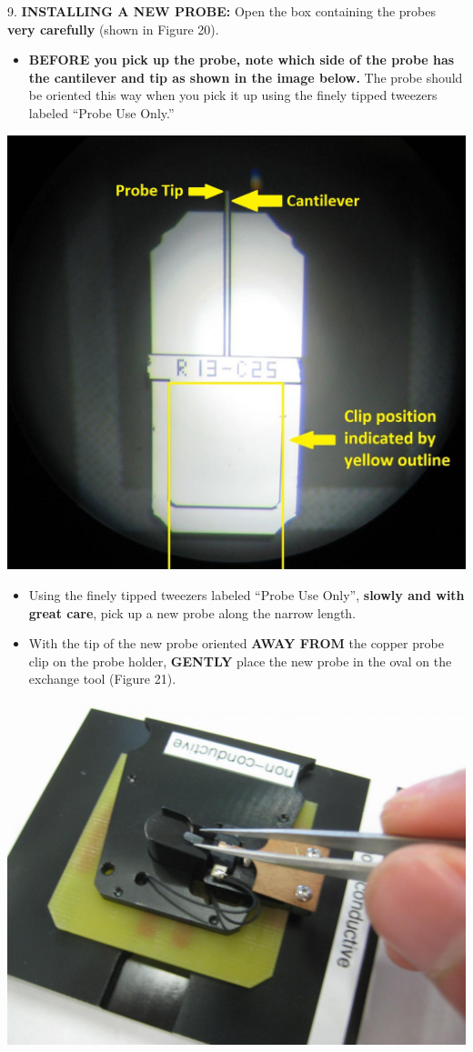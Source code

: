 \documentclass{../lab}
\begin{document}
9.  \textbf{INSTALLING A NEW PROBE:}  Open the box containing the probes\textbf{ very carefully} (shown in Figure 20).

\begin{itemize}
    \item \textbf{BEFORE you pick up the probe, note which side of the probe has the cantilever and tip as shown in the image below.}  The probe should be oriented this way when you pick it up using the finely tipped tweezers labeled ``Probe Use Only.''

\end{itemize}


\begin{center}
    \href{http://experimentationlab.berkeley.edu/sites/default/files/AFMImages/AFMprobe.JPG}{\includegraphics[width=0.5\linewidth]{images/AFMprobe.JPG}}
\end{center}

\begin{itemize}
    \item Using the finely tipped tweezers labeled ``Probe Use Only'', \textbf{slowly and with great care}, pick up a new probe along the narrow length.

    \item With the tip of the new probe oriented \textbf{AWAY FROM}\textbf{ }the copper probe clip on the probe holder, \textbf{GENTLY} place the new probe in the oval on the exchange tool (Figure 21).

\end{itemize}


\begin{center}
    \href{http://experimentationlab.berkeley.edu/sites/default/files/AFMImages/21.JPG}{\includegraphics[width=0.5\linewidth]{images/21.JPG}}
\end{center}
\end{document}
